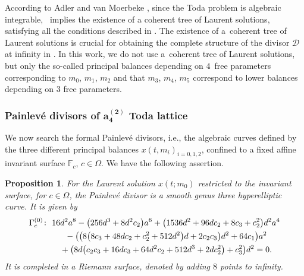 \documentclass[pdftex]{sigma}
\numberwithin{equation}{section}
\newtheorem{Proposition}[Theorem]{Proposition}
 { \theoremstyle{definition}
\newtheorem{Definition}[Theorem]{Definition}
\newtheorem{Note}[Theorem]{Note}
\newtheorem{Example}[Theorem]{Example}
\newtheorem{Remark}[Theorem]{Remark} }
\begin{document}
According to Adler and van Moerbeke \cite{al_Moer4}, since the Toda
problem is algebraic integrable, \cite[Theorem~1]{al_Moer2}~implies the existence of a coherent tree of Laurent solutions,
satisfying all the conditions described in \cite{al_Moer3}. The
existence of a~coherent tree of Laurent solutions is crucial for
obtaining the complete structure of the divisor $\mathcal{D}$ at
infinity in \cite{al_Moer4}. In this work, we do not use a~coherent
tree of Laurent solutions, but only the so-called principal balances
depending on $4$~free parameters corresponding to $m_0$, $m_1$, $m_2$
and that $m_3$, $m_4$, $m_5$ correspond to lower balances depending on
$3$ free parameters.

\subsubsection[Painlev\'e divisors of a\_4\^{}(2) Toda lattice]{Painlev\'e divisors of $\boldsymbol{a_4^{(2)}}$ Toda lattice}

We now search the formal Painlev\'e divisors, i.e., the algebraic
curves defined by the three different principal balances
$x(t,m_i)_{i=0,1,2}$, confined to a fixed affine invariant surface
$\mathbb{F}_c$, $c \in \Omega$. We have the following assertion.

\begin{Proposition}\label{proposition3.4}
For the Laurent solution $x(t;m_0)$ restricted to the
invariant surface, for $c \in \Omega$, the Painlev\'e divisor
 is a smooth genus three hyperelliptic
curve. It is given by
\begin{gather*}
 \Gamma_c^{(0)}\colon \ 16d^2a^8-\bigl(256d^3+8d^2c_2\bigr)a^6+ \bigl(1536d^2+96dc_2+8c_3+c_2^2\bigr)d^2a^4 \\
 \hphantom{\Gamma_c^{(0)}\colon} \ {}-\bigl(\bigl(8\bigl(8c_3+48dc_2+c_2^2+512d^2\bigr)d+2c_2c_3\bigr)d^2+64c_1\bigr)a^2 \\
 \hphantom{\Gamma_c^{(0)}\colon} \ {} +\bigl(8d\bigl(c_2c_3+16dc_3+64d^2c_2 +512d^3+2dc_2^2\bigr)+c_3^2\bigr)d^2=0.
\end{gather*}
It is completed in a Riemann surface, denoted
 by adding $8$ points to
infinity.
\end{Proposition}
\end{document}
